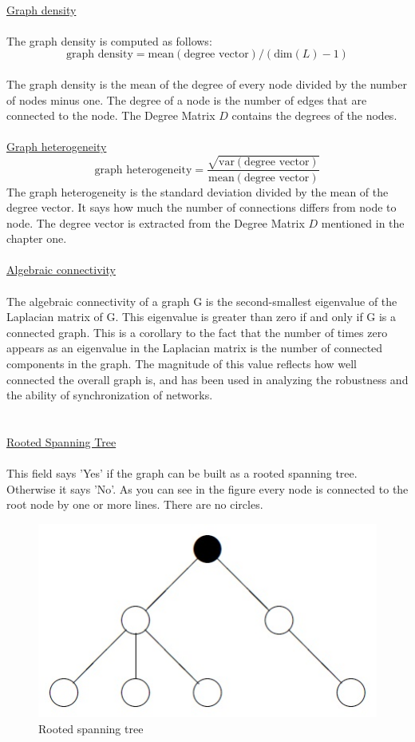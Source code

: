\documentclass[12pt]{report}
\begin{document}
\\
\underline{Graph density}\\
\\
The graph density is computed as follows:\\
\begin{equation}
\mbox{graph density} = \mbox{mean}(\mbox{degree vector})/(\mbox{dim}(L)-1)
\label{EQ:gleichung6}
\end{equation}
\\
The graph density is the mean of the degree of every node divided by the number of nodes minus one. The degree of a node is the number of edges that are connected to the node. The Degree Matrix $ D $ contains the degrees of the nodes.\\
\\
\underline{Graph heterogeneity}\\
\begin{equation}
\mbox{graph heterogeneity} = \frac{\sqrt{\mbox{var}(\mbox{degree vector})}}{\mbox{mean}(\mbox{degree vector})}
\label{EQ:gleichung7}
\end{equation}
The graph heterogeneity is the standard deviation divided by the mean of the degree vector. It says how much the number of connections differs from node to node. The degree vector is extracted from the Degree Matrix $ D $ mentioned in the chapter one.\\
\\
\underline{Algebraic connectivity}\\
\\
The algebraic connectivity of a graph G is the second-smallest eigenvalue of the Laplacian matrix of G. This eigenvalue is greater than zero if and only if G is a connected graph. This is a corollary to the fact that the number of times zero appears as an eigenvalue in the Laplacian matrix is the number of connected components in the graph. The magnitude of this value reflects how well connected the overall graph is, and has been used in analyzing the robustness and the ability of synchronization of networks.\\
\\
\\
\underline{Rooted Spanning Tree}\\
\\
This field says 'Yes' if the graph can be built as a rooted spanning tree. Otherwise it says 'No'.
As you can see in the figure every node is connected to the root node by one or more lines. There are no circles.
\begin{figure}[h]
\centering
\includegraphics[scale=.6]{rootspant}
\caption{Rooted spanning tree}
\label{FIG:abb46}
\end{figure}
\end{document}
